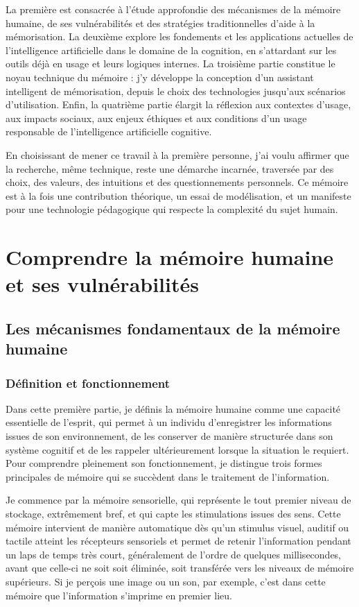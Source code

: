 \documentclass[11pt,a4paper]{report}
\begin{document}
La première est consacrée à l’étude approfondie des mécanismes de la mémoire humaine, de ses vulnérabilités et des stratégies traditionnelles d’aide à la mémorisation. La deuxième explore les fondements et les applications actuelles de l’intelligence artificielle dans le domaine de la cognition, en s’attardant sur les outils déjà en usage et leurs logiques internes. La troisième partie constitue le noyau technique du mémoire : j’y développe la conception d’un assistant intelligent de mémorisation, depuis le choix des technologies jusqu’aux scénarios d’utilisation. Enfin, la quatrième partie élargit la réflexion aux contextes d’usage, aux impacts sociaux, aux enjeux éthiques et aux conditions d’un usage responsable de l’intelligence artificielle cognitive.

En choisissant de mener ce travail à la première personne, j’ai voulu affirmer que la recherche, même technique, reste une démarche incarnée, traversée par des choix, des valeurs, des intuitions et des questionnements personnels. Ce mémoire est à la fois une contribution théorique, un essai de modélisation, et un manifeste pour une technologie pédagogique qui respecte la complexité du sujet humain.

\chapter{Comprendre la mémoire humaine et ses vulnérabilités}
\section{Les mécanismes fondamentaux de la mémoire humaine}
\subsection{Définition et fonctionnement}
Dans cette première partie, je définis la mémoire humaine comme une capacité essentielle de l’esprit, qui permet à un individu d’enregistrer les informations issues de son environnement, de les conserver de manière structurée dans son système cognitif et de les rappeler ultérieurement lorsque la situation le requiert. Pour comprendre pleinement son fonctionnement, je distingue trois formes principales de mémoire qui se succèdent dans le traitement de l’information.

Je commence par la mémoire sensorielle, qui représente le tout premier niveau de stockage, extrêmement bref, et qui capte les stimulations issues des sens. Cette mémoire intervient de manière automatique dès qu’un stimulus visuel, auditif ou tactile atteint les récepteurs sensoriels et permet de retenir l’information pendant un laps de temps très court, généralement de l’ordre de quelques millisecondes, avant que celle-ci ne soit soit éliminée, soit transférée vers les niveaux de mémoire supérieurs. Si je perçois une image ou un son, par exemple, c’est dans cette mémoire que l’information s’imprime en premier lieu.
\end{document}
